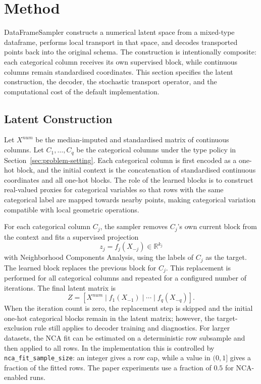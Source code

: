 \section{Method}
\label{sec:method}

DataFrameSampler constructs a numerical latent space from a mixed-type
dataframe, performs local transport in that space, and decodes transported
points back into the original schema. The construction is intentionally
composite: each categorical column receives its own supervised block, while
continuous columns remain standardised coordinates. This section specifies the
latent construction, the decoder, the stochastic transport operator, and the
computational cost of the default implementation.

\subsection{Latent Construction}

Let $X^{num}$ be the median-imputed and standardised matrix of continuous
columns. Let $C_1,\ldots,C_q$ be the categorical columns under the type policy
in Section~\ref{sec:problem-setting}. Each categorical column is first encoded
as a one-hot block, and the initial context is the concatenation of
standardised continuous coordinates and all one-hot blocks.
The role of the learned blocks is to construct real-valued proxies for
categorical variables so that rows with the same categorical label are mapped
towards nearby points, making categorical variation compatible with local
geometric operations.

For each categorical column $C_j$, the sampler removes $C_j$'s own current
block from the context and fits a supervised projection
\[
  z_j = f_j(X_{-j}) \in \mathbb{R}^{k_j}
\]
with Neighborhood Components Analysis, using the labels of $C_j$ as the target.
The learned block replaces the previous block for $C_j$. This replacement is
performed for all categorical columns and repeated for a configured number of
iterations. The final latent matrix is
\[
  Z = [X^{num} \mid f_1(X_{-1}) \mid \cdots \mid f_q(X_{-q})].
\]
When the iteration count is zero, the replacement step is skipped and the
initial one-hot categorical blocks remain in the latent matrix; however, the
target-exclusion rule still applies to decoder training and diagnostics.
For larger datasets, the NCA fit can be estimated on a deterministic row
subsample and then applied to all rows. In the implementation this is controlled
by \texttt{nca\_fit\_sample\_size}: an integer gives a row cap, while a value in
$(0,1]$ gives a fraction of the fitted rows. The paper experiments use a
fraction of $0.5$ for NCA-enabled runs.

